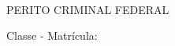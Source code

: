 \bigskip
\begin{center}
	~\bigskip

	\textbf{\MakeUppercase{\pfauthor}}
	
	PERITO CRIMINAL FEDERAL
	
	Classe \pfauthorclass\space - Matrícula: \pfauthormatr

\end{center}
